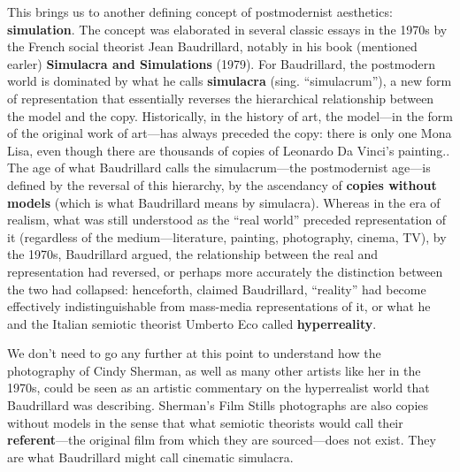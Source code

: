 \documentclass[
  letterpaper,
  DIV=11,
  numbers=noendperiod,
  oneside]{scrartcl}
\begin{document}
This brings us to another defining concept of postmodernist aesthetics:
\textbf{simulation}. The concept was elaborated in several classic
essays in the 1970s by the French social theorist Jean Baudrillard,
notably in his book (mentioned earler) \textbf{Simulacra and
Simulations} (1979). For Baudrillard, the postmodern world is dominated
by what he calls \textbf{simulacra} (sing. ``simulacrum''), a new form
of representation that essentially reverses the hierarchical
relationship between the model and the copy. Historically, in the
history of art, the model---in the form of the original work of
art---has always preceded the copy: there is only one Mona Lisa, even
though there are thousands of copies of Leonardo Da Vinci's
painting.{}. The age of what Baudrillard calls
the simulacrum---the postmodernist age---is defined by the reversal of
this hierarchy, by the ascendancy of \textbf{copies without models}
(which is what Baudrillard means by simulacra). Whereas in the era of
realism, what was still understood as the ``real world'' preceded
representation of it (regardless of the medium---literature, painting,
photography, cinema, TV), by the 1970s, Baudrillard argued, the
relationship between the real and representation had reversed, or
perhaps more accurately the distinction between the two had collapsed:
henceforth, claimed Baudrillard, ``reality'' had become effectively
indistinguishable from mass-media representations of it, or what he and
the Italian semiotic theorist Umberto Eco called \textbf{hyperreality}.

We don't need to go any further at this point to understand how the
photography of Cindy Sherman, as well as many other artists like her in
the 1970s, could be seen as an artistic commentary on the hyperrealist
world that Baudrillard was describing. Sherman's Film Stills photographs
are also copies without models in the sense that what semiotic theorists
would call their \textbf{referent}---the original film from which they
are sourced---does not exist. They are what Baudrillard might call
cinematic simulacra.
\end{document}
